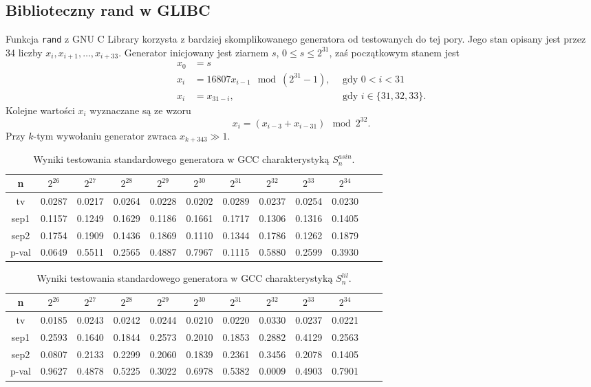 \documentclass[a4paper,11pt,twoside]{book}
\newcommand{\Slil}[1]{S^{lil}_#1}
\newcommand{\Sasin}[1]{S^{asin}_#1}
\theoremstyle{definition}
\begin{document}
\subsection{Biblioteczny rand w GLIBC}
Funkcja \texttt{rand} z GNU C Library korzysta z bardziej skomplikowanego generatora od testowanych do tej pory. Jego stan opisany jest przez 34 liczby  $x_i, x_{i+1},\ldots, x_{i+33}$. Generator inicjowany jest ziarnem $s$, $0 \leq s \leq 2^{31}$, zaś początkowym stanem jest
\begin{align*}
  x_0 &= s & \\
  x_i &= 16807 x_{i-1} \mod (2^{31}-1),\ \ &\mbox{gdy } 0 < i < 31\\
  x_i &= x_{31-i}, &\mbox{gdy } i \in \{31,32,33\}.
\end{align*}
Kolejne wartości $x_i$ wyznaczane są ze wzoru
\[ x_i = (x_{i-3} + x_{i-31}) \mod2^{32}. \]
Przy $k$-tym wywołaniu generator zwraca $x_{k+343} \gg 1$.
\begin{table}[ht!]
\centering
 \caption{Wyniki testowania standardowego generatora w GCC charakterystyką $\Sasin{n}$.}
 \label{tab:mojkomp_asin}
\begin{tabular} {||c|c|c|c|c|c|c|c|c|c|c|c||}  
 \hline
     n &  $2^{26}$ &  $2^{27}$ &  $2^{28}$ &  $2^{29}$ &  $2^{30}$ &  $2^{31}$ &  $2^{32}$ &  $2^{33}$ &  $2^{34}$\\ \hline
     tv &  0.0287 &  0.0217 &  0.0264 &  0.0228 &  0.0202 &  0.0289 &  0.0237 &  0.0254 &  0.0230\\ \hline
   sep1 &  0.1157 &  0.1249 &  0.1629 &  0.1186 &  0.1661 &  0.1717 &  0.1306 &  0.1316 &  0.1405\\ \hline
   sep2 &  0.1754 &  0.1909 &  0.1436 &  0.1869 &  0.1110 &  0.1344 &  0.1786 &  0.1262 &  0.1879\\ \hline
  p-val &  0.0649 &  0.5511 &  0.2565 &  0.4887 &  0.7967 &  0.1115 &  0.5880 &  0.2599 &  0.3930\\ \hline 
\end{tabular}  
\end{table}
\begin{table}[ht!]
\centering
 \caption{Wyniki testowania standardowego generatora w GCC charakterystyką $\Slil{n}$.}
 \label{tab:mojkomp_lil}
\begin{tabular} {||c|c|c|c|c|c|c|c|c|c|c|c||}  
 \hline 
     n &  $2^{26}$ &  $2^{27}$ &  $2^{28}$ &  $2^{29}$ &  $2^{30}$ &  $2^{31}$ &  $2^{32}$ &  $2^{33}$ &  $2^{34}$\\ \hline
     tv &  0.0185 &  0.0243 &  0.0242 &  0.0244 &  0.0210 &  0.0220 &  0.0330 &  0.0237 &  0.0221\\ \hline
   sep1 &  0.2593 &  0.1640 &  0.1844 &  0.2573 &  0.2010 &  0.1853 &  0.2882 &  0.4129 &  0.2563\\ \hline
   sep2 &  0.0807 &  0.2133 &  0.2299 &  0.2060 &  0.1839 &  0.2361 &  0.3456 &  0.2078 &  0.1405\\ \hline
  p-val &  0.9627 &  0.4878 &  0.5225 &  0.3022 &  0.6978 &  0.5382 &  0.0009 &  0.4903 &  0.7901\\ \hline
\end{tabular}  
\end{table}
\end{document}
